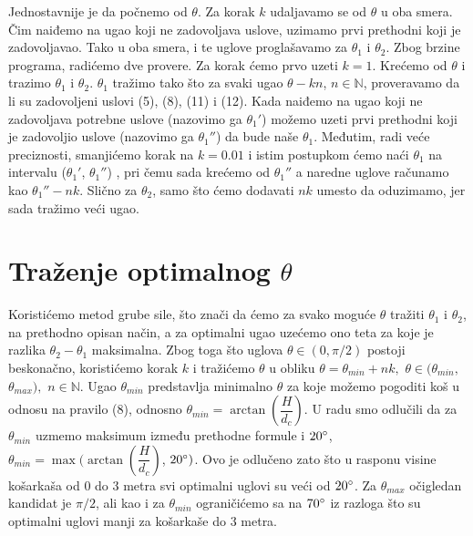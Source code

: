 \documentclass[a4paper, 12pt]{article}
\begin{document}
Jednostavnije je da počnemo od $\theta$. Za korak $k$ udaljavamo se od $\theta$ u oba smera. Čim naiđemo na ugao koji ne zadovoljava uslove, uzimamo prvi prethodni koji je zadovoljavao. Tako u oba smera, i te uglove proglašavamo za $\theta_1$ i $\theta_2$. Zbog brzine programa, radićemo dve provere. Za korak ćemo prvo uzeti $k = 1$. Krećemo od $\theta$ i trazimo $\theta_1$ i $\theta_2$.
$\theta_1$ tražimo tako što za svaki ugao $\theta - kn$, $n \in  \mathbb{N}$, proveravamo da li su zadovoljeni uslovi (5), (8), (11) i (12).
Kada naiđemo na ugao koji ne zadovoljava potrebne uslove (nazovimo ga $\theta_1'$) možemo uzeti prvi prethodni koji je zadovoljio uslove (nazovimo ga $\theta_1''$) da bude naše $\theta_1$.
Međutim, radi veće preciznosti, smanjićemo korak na $k = 0.01$ i istim postupkom ćemo naći $\theta_1$ na intervalu ($\theta_1'$, $\theta_1''$) , pri čemu sada krećemo od $\theta_1''$ a naredne uglove računamo kao $\theta_1'' - nk$. Slično za $\theta_2$, samo što ćemo dodavati $nk$ umesto da oduzimamo, jer sada tražimo veći ugao.



\section{Traženje optimalnog $\theta$}


Koristićemo metod grube sile, što znači da ćemo za svako moguće $\theta$ tražiti $\theta_1$ i $\theta_2$, na prethodno opisan način, a za optimalni ugao uzećemo ono teta za koje je razlika $\theta_2-\theta_1$ maksimalna.
 Zbog toga što uglova $\theta \in (0,\pi/2)$ postoji beskonačno, koristićemo korak $k$ i tražićemo $\theta$ u obliku $ \theta = \theta_{min} + nk,$ $\theta \in (\theta_{min},$ $\theta_{max}),$ $n \in  \mathbb{N}$. Ugao $\theta_{min}$ predstavlja minimalno $\theta$ za koje možemo pogoditi koš u odnosu na pravilo (8), odnosno $\theta_{min} = \arctan(\dfrac{H}{d_c})$. U radu smo odlučili da za $\theta_{min}$ uzmemo maksimum između prethodne formule i $20\degree$, $\theta_{min} = \max(\arctan(\dfrac{H}{d_c})$, $20\degree)$. Ovo je odlučeno zato što u rasponu visine košarkaša od $0$ do $3$ metra svi optimalni uglovi su veći od $20\degree$. Za $\theta_{max}$ očigledan kandidat je $\pi/2$, ali kao i za $\theta_{min}$ ograničićemo sa na $70 \degree$ iz razloga što su optimalni uglovi manji za košarkaše do 3 metra.
\end{document}
